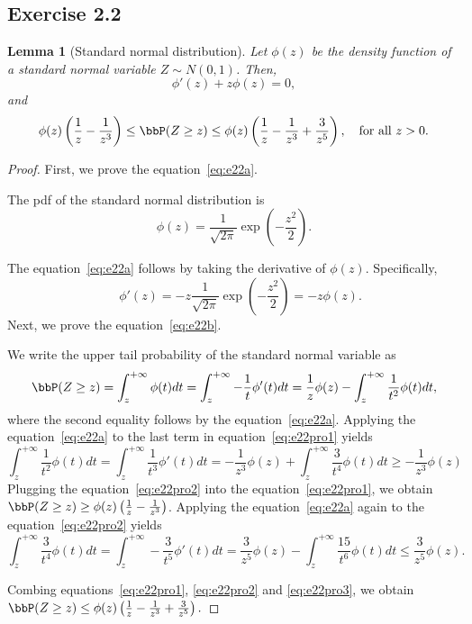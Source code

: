 \documentclass[11pt]{article}
\theoremstyle{plain}
\newtheorem{lem}{Lemma}
\theoremstyle{definition}
\begin{document}
\subsection{Exercise 2.2}
\begin{lem}[Standard normal distribution]\label{lem:n01}
	Let $\phi(z)$ be the density function of a standard normal variable $Z \sim N(0,1)$. Then, 
	\begin{equation}\label{eq:e22a}
		\phi'(z) + z \phi(z) = 0,
	\end{equation}
	and \begin{equation}\label{eq:e22b}
		\phi(z)\left(\frac{1}{z} - \frac{1}{z^3} \right) \leq \bbP(Z \geq z) \leq \phi(z)\left(\frac{1}{z} - \frac{1}{z^3}+ \frac{3}{z^5} \right), \quad \text{for all }z>0.
	\end{equation}
\end{lem}
\begin{proof}First, we prove the equation~\eqref{eq:e22a}. 

The pdf of the standard normal distribution is
\[  \phi(z) = \frac{1}{\sqrt{2\pi}} \exp\left(-\frac{z^2}{2}  \right).\]

The equation~\eqref{eq:e22a} follows by taking the derivative of $\phi(z)$. Specifically,
\[\quad \phi'(z) = -z \frac{1}{\sqrt{2\pi}} \exp\left(-\frac{z^2}{2} \right) = -z \phi(z). \] 
	Next, we prove the equation~\eqref{eq:e22b}. 
	
	We write the upper tail probability of the standard normal variable as
	\begin{equation}\label{eq:e22pro1}
		\bbP(Z \geq z) = \int_{z}^{+\infty} \phi(t) dt = \int_{z}^{+\infty} - \frac{1}{t} \phi'(t) dt = \frac{1}{z} \phi(z) - \int_{z}^{+\infty} \frac{1}{t^2} \phi(t) dt,  
	\end{equation}
	where the second equality follows by the equation~\eqref{eq:e22a}. Applying the equation~\eqref{eq:e22a} to the last term in equation~\eqref{eq:e22pro1} yields
	\begin{equation}\label{eq:e22pro2}
	\int_{z}^{+\infty} \frac{1}{t^2} \phi(t) dt = \int_{z}^{+\infty} \frac{1}{t^3} \phi'(t) dt = - \frac{1}{z^3} \phi(z) + \int_{z}^{+\infty} \frac{3}{t^4} \phi(t) dt \geq  - \frac{1}{z^3} \phi(z)
	\end{equation}
	Plugging the equation~\eqref{eq:e22pro2} into the equation~\eqref{eq:e22pro1}, we obtain $\bbP(Z \geq z) \geq \phi(z)\left(\frac{1}{z}  - \frac{1}{z^3} \right)$. Applying the equation~\eqref{eq:e22a} again to the equation~\eqref{eq:e22pro2} yields
	\begin{equation}\label{eq:e22pro3}
		\int_{z}^{+\infty} \frac{3}{t^4} \phi(t) dt = \int_{z}^{+\infty} - \frac{3}{t^5} \phi'(t) dt =\frac{3}{ z^5} \phi(z) -  \int_{z}^{+\infty} \frac{15}{t^6} \phi(t) dt \leq \frac{3}{ z^5} \phi(z).
	\end{equation}
	
	Combing equations~\eqref{eq:e22pro1}, \eqref{eq:e22pro2} and  \eqref{eq:e22pro3}, we obtain $\bbP(Z \geq z) \leq \phi(z)\left(\frac{1}{z}  - \frac{1}{z^3} + \frac{3}{z^5} \right).$
\end{proof}
\end{document}
